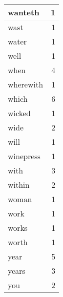 \begin{center}
\begin{longtable}{l|r}
wanteth & 1 \\ \hline
wast & 1 \\ \hline
water & 1 \\ \hline
well & 1 \\ \hline
when & 4 \\ \hline
wherewith & 1 \\ \hline
which & 6 \\ \hline
wicked & 1 \\ \hline
wide & 2 \\ \hline
will & 1 \\ \hline
winepress & 1 \\ \hline
with & 3 \\ \hline
within & 2 \\ \hline
woman & 1 \\ \hline
work & 1 \\ \hline
works & 1 \\ \hline
worth & 1 \\ \hline
year & 5 \\ \hline
years & 3 \\ \hline
you & 2 \\ \hline
\end{longtable}
\end{center}



\normalsize



